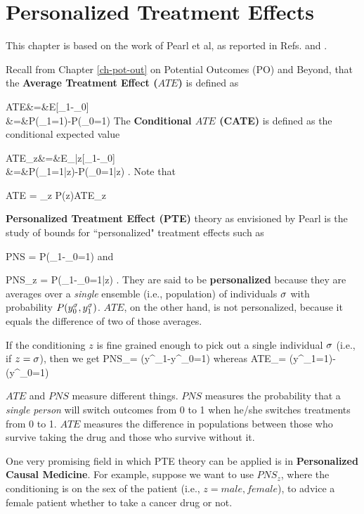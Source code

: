 \chapter{Personalized Treatment Effects}
\label{ch-personalized}


This chapter
is based on the work of Pearl et al, as reported in
Refs.
\cite{pearl-tian-2000} and
\cite{personalized-pearl-2021}.

Recall from Chapter \ref{ch-pot-out}
on Potential Outcomes (PO)
and Beyond, that
the {\bf Average Treatment Effect ($ATE$)}
is defined as

\beqa
ATE&=&E[\rvy_1-\rvy_0]
\\
&=&P(\rvy_1=1)-P(\rvy_0=1)
\eeqa
The {\bf Conditional $ATE$ (CATE) }
is defined as
the conditional expected value

\beqa
ATE_z&=&E_{|z}[\rvy_1-\rvy_0]
\\
&=&P(\rvy_1=1|z)-P(\rvy_0=1|z)
\;.
\eeqa
Note that

\beq ATE = \sum_z  P(z)ATE_z
\eeq

{\bf
Personalized Treatment Effect (PTE)}
theory
as envisioned by Pearl
is the study
of
bounds
for ``personalized"
 treatment
effects such as

\beq
PNS = P(\rvy_1-\rvy_0=1)
\eeq
and

\beq
PNS_z = P(\rvy_1-\rvy_0=1|z)
\;.
\eeq
They are said to be {\bf personalized}
because they are averages
over a {\it single}
ensemble (i.e., population)
of individuals $\sigma$ with probability
 $P(y^\sigma_0, y^\sigma_1)$.
$ATE$, on the other hand, is not
personalized, because it equals the
difference of two of those averages.


If the conditioning $z$
is fine grained enough
to pick out a single individual
$\sigma$ (i.e., if $z=\sigma$), then
we get
\beq
PNS_\s = \indi(y^\s_1-y^\s_0=1)
\;
\eeq
whereas
\beq
ATE_\s = \indi(y^\s_1=1)-\indi(y^\s_0=1)
\eeq

$ATE$ and $PNS$ measure different things.   $PNS$
measures the probability
that a {\it single person} will switch outcomes from 0 to 1 when he/she
switches treatments from 0 to 1. $ATE$
 measures the difference in
populations between
 those who survive taking the drug and those who
 survive without it.


One
very promising
field in
which PTE theory
can be applied
is in {\bf Personalized Causal Medicine}.
For example, suppose we want to
 use $PNS_z$,
where the conditioning is on the
sex of the patient (i.e., $z=male, female$),
to advice a female  patient
whether to take a cancer drug or not.

